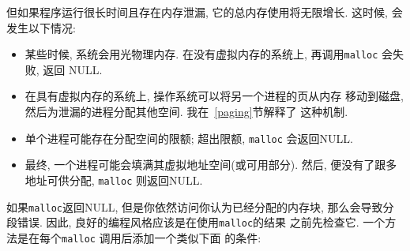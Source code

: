 \documentclass[12pt]{book}
\begin{document}
{%
但如果程序运行很长时间且存在内存泄漏, 它的总内存使用将无限增长. 
这时候, 会发生以下情况:

\begin{itemize}

\item 某些时候, 系统会用光物理内存. 在没有虚拟内存的系统上, 
  再调用{\tt malloc} 会失败, 返回 NULL.

\item 在具有虚拟内存的系统上, 操作系统可以将另一个进程的页从内存
  移动到磁盘, 然后为泄漏的进程分配其他空间. 我在~\ref{paging}节解释了
  这种机制.

\item 单个进程可能存在分配空间的限额; 超出限额, {\tt malloc} 会返回NULL.

\item 最终, 一个进程可能会填满其虚拟地址空间(或可用部分). 
  然后, 便没有了跟多地址可供分配, {\tt malloc} 则返回NULL.

\end{itemize}

如果{\tt malloc}返回NULL, 但是你依然访问你认为已经分配的内存块, 
那么会导致分段错误. 因此, 良好的编程风格应该是在使用{\tt malloc}的结果
之前先检查它. 一个方法是在每个{\tt malloc} 调用后添加一个类似下面
的条件:  

}
\end{document}
